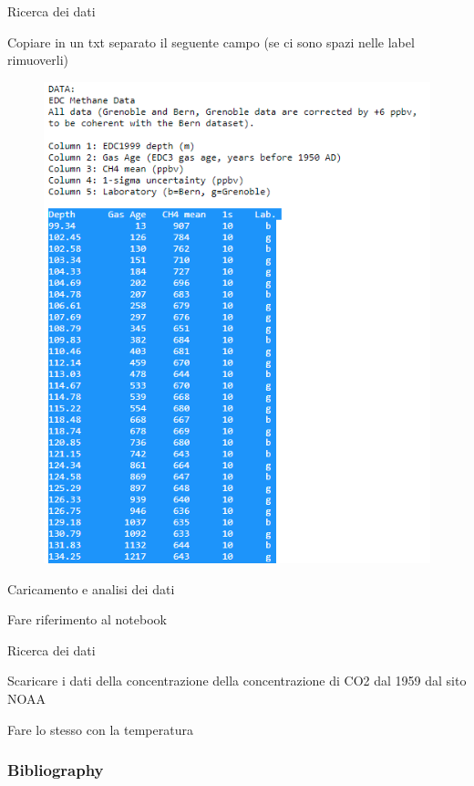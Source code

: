 \documentclass{beamer}
\begin{document}
\begin{frame}{Ricerca dei dati}
\begin{center}
Copiare in un txt separato il seguente campo (se ci sono spazi nelle label rimuoverli)
\end{center}
\begin{figure}
\begin{center}
\includegraphics[width=\textwidth ]{Pic/CH4_DATA.png}
\end{center}
\end{figure}
\end{frame}


\begin{frame}{Caricamento e analisi dei dati}
\begin{center}
Fare riferimento al notebook 
\end{center}
\end{frame}


\begin{frame}{Ricerca dei dati}
\begin{item}
\item Scaricare i dati della concentrazione della concentrazione di CO2 dal 1959 dal sito NOAA
 \href{https://gml.noaa.gov/webdata/ccgg/trends/co2/co2_annmean_mlo.txt}{}
\item Fare lo stesso con la temperatura  \href{https://www.ncdc.noaa.gov/cag/global/time-series/globe/land_ocean/1/12/1959-2021}{}
\end{item}
\end{frame}


\begin{frame}[t,allowframebreaks]
\frametitle{Bibliography}
\printbibliography
\end{frame}
\end{document}
